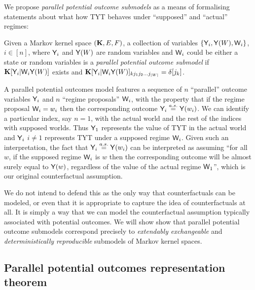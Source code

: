 We propose \emph{parallel potential outcome submodels} as a means of formalising statements about what how TYT behaves under ``supposed'' and ``actual'' regimes:

\begin{definition}\label{def:pa_pot_outcomes}
Given a Markov kernel space $(\mathbf{K},E,F)$, a collection of variables $\{\mathsf{Y}_i, \mathsf{Y}(W), \mathsf{W}_i\}$, $i\in [n]$, where $\mathsf{Y}_i$ and $\mathsf{Y}(W)$ are random variables and $\mathsf{W}_i$ could be either a state or random variables is a \emph{parallel potential outcome submodel} if $\mathbf{K}[\mathsf{Y}_i|\mathsf{W}_i\mathsf{Y}(W)]$ exists and $\mathbf{K}[\mathsf{Y}_i|\mathsf{W}_i\mathsf{Y}(W)]_{k j_1 j_2 ... j_{|W|}} = \delta[j_k]$.
\end{definition}


A parallel potential outcomes model features a sequence of $n$ ``parallel'' outcome variables $\mathsf{Y}_i$ and $n$ ``regime proposals'' $\mathsf{W}_i$, with the property that if the regime proposal $\mathsf{W}_i=w_i$ then the corresponding outcome $\mathsf{Y}_i\overset{a.s.}{=} \mathsf{Y}(w_i)$. We can identify a particular index, say $n=1$, with the actual world and the rest of the indices with supposed worlds. Thus $\mathsf{Y}_1$ represents the value of TYT in the actual world and $\mathsf{Y}_i$ $i\neq 1$ represents TYT under a supposed regime $\mathsf{W}_i$. Given such an interpretation, the fact that $\mathsf{Y}_i\overset{a.s.}{=} \mathsf{Y}(w_i)$ can be interpreted as assuming ``for all $w$, if the supposed regime $\mathsf{W}_i$ is $w$ then the corresponding outcome will be almost surely equal to $\mathsf{Y}(w)$, regardless of the value of the actual regime $\mathsf{W}_1$'', which is our original counterfactual assumption.

We do not intend to defend this as the only way that counterfactuals can be modeled, or even that it is appropriate to capture the idea of counterfactuals at all. It is simply a way that we can model the counterfactual assumption typically associated with potential outcomes. We will show show that parallel potential outcome submodels correspond precisely to \emph{extendably exchangeable} and \emph{deterministically reproducible} submodels of Markov kernel spaces.


\subsection{Parallel potential outcomes representation theorem}

